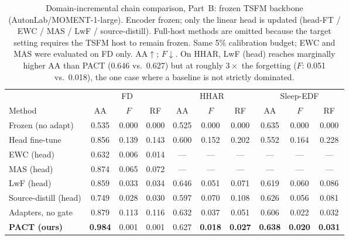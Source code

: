 \begin{table}[t]
\centering
\caption{Domain-incremental chain comparison, Part~B: frozen TSFM backbone
(AutonLab/MOMENT-1-large). Encoder frozen; only the linear head is updated
(head-FT / EWC / MAS / LwF / source-distill). Full-host methods are omitted
because the target setting requires the TSFM host to remain frozen. Same 5\%
calibration budget; EWC and MAS were evaluated on FD only.
AA$\uparrow$; $F$$\downarrow$. On HHAR, LwF (head)
reaches marginally higher AA than PACT (0.646 vs.\ 0.627) but at roughly
$3\times$ the forgetting ($F$: 0.051 vs.\ 0.018), the one case where a
baseline is not strictly dominated.}
\label{tab:chain-moment}
\small
\begin{tabular}{l ccc ccc ccc}
\toprule
& \multicolumn{3}{c}{FD} & \multicolumn{3}{c}{HHAR} & \multicolumn{3}{c}{Sleep-EDF}\\
\cmidrule(lr){2-4}\cmidrule(lr){5-7}\cmidrule(lr){8-10}
Method & AA & $F$ & RF & AA & $F$ & RF & AA & $F$ & RF\\
\midrule
Frozen (no adapt) & 0.535 & 0.000 & 0.000 & 0.525 & 0.000 & 0.000 & 0.635 & 0.000 & 0.000\\
Head fine-tune & 0.856 & 0.139 & 0.143 & 0.600 & 0.152 & 0.202 & 0.552 & 0.164 & 0.228\\
EWC (head) & 0.632 & 0.006 & 0.014 & --- & --- & --- & --- & --- & ---\\
MAS (head) & 0.874 & 0.065 & 0.072 & --- & --- & --- & --- & --- & ---\\
LwF (head) & 0.859 & 0.033 & 0.034 & 0.646 & 0.051 & 0.071 & 0.619 & 0.060 & 0.086\\
Source-distill (head) & 0.749 & 0.028 & 0.030 & 0.597 & 0.070 & 0.108 & 0.626 & 0.056 & 0.081\\
Adapters, no gate & 0.879 & 0.113 & 0.116 & 0.632 & 0.037 & 0.051 & 0.606 & 0.022 & 0.032\\
\textbf{PACT (ours)} & \textbf{0.984} & 0.001 & 0.001 & 0.627 & \textbf{0.018} & \textbf{0.027} & \textbf{0.638} & \textbf{0.020} & \textbf{0.031}\\
\bottomrule
\end{tabular}
\end{table}

